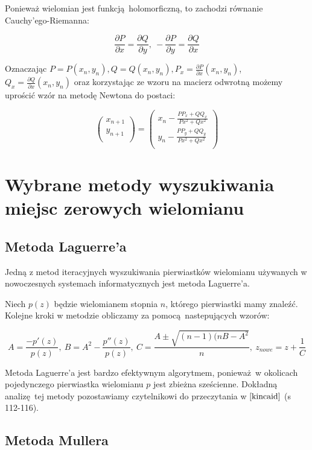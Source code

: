 \documentclass{article}
\begin{document}
Ponieważ wielomian jest funkcją holomorficzną, to zachodzi równanie Cauchy'ego-Riemanna:

$$\frac{\partial P}{\partial x} = \frac{\partial Q}{\partial y}, \ - \frac{\partial P}{\partial y} =\frac{\partial Q}{\partial x}$$

Oznaczając $P = P(x_n, y_n), Q = Q(x_n, y_n), P_x = \frac{\partial P}{\partial x}(x_n, y_n)$, $Q_x = \frac{\partial Q}{\partial x}(x_n, y_n)$ oraz korzystając ze wzoru na macierz odwrotną możemy uprościć wzór na metodę Newtona do postaci:

$$
\begin{pmatrix} x_{n+1}\\ y_{n+1}\\ \end{pmatrix} = \begin{pmatrix} x_n - \frac{ P P_x + Q Q_x}{Px^2 + Qx^2}\\ y_n - \frac{P P_y + Q Q_y}{Px^2 + Qx^2} \\ \end{pmatrix}
$$


\lstset{language=Haskell, label=DescriptiveLabel, frame=shadowbox}


\section{Wybrane metody wyszukiwania miejsc zerowych wielomianu}

\subsection{Metoda Laguerre'a}

Jedną z metod iteracyjnych wyszukiwania pierwiastków wielomianu używanych w nowoczesnych systemach informatycznych jest metoda Laguerre'a. 

Niech $p(z)$ będzie wielomianem stopnia $n$, którego pierwiastki mamy znaleźć. Kolejne kroki w metodzie obliczamy za pomocą nastepujących wzorów:

$$ A = \frac{-p'(z)}{p(z)}, \ B = A^2 - \frac{p''(z)}{p(z)}, \ C = \frac{A \pm \sqrt{(n-1)(nB - A^2}}{n}, \ z_{nowe} = z + \frac{1}{C}$$ 

Metoda Laguerre'a jest bardzo efektywnym algorytmem, ponieważ w okolicach pojedynczego pierwiastka wielomianu $p$ jest zbieżna sześcienne. Dokładną analizę tej metody pozostawiamy czytelnikowi do przeczytania w $\cite{kincaid}$ (s 112-116).

\subsection{Metoda Mullera}
\end{document}
